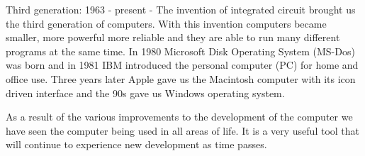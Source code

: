 \begin{frame}
Third generation: 1963 - present - The invention of integrated circuit brought us the third generation of computers. With this invention computers became smaller, more powerful more reliable and they are able to run many different programs at the same time. In 1980 Microsoft Disk Operating System (MS-Dos) was born and in 1981 IBM introduced the personal computer (PC) for home and office use. Three years later Apple gave us the Macintosh computer with its icon driven interface and the 90s gave us Windows operating system.

As a result of the various improvements to the development of the computer we have seen the computer being used in all areas of life. It is a very useful tool that will continue to experience new development as time passes.
\end{frame}

